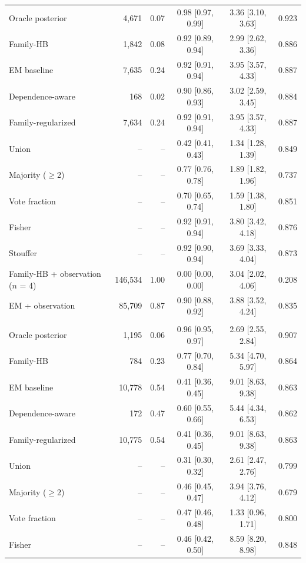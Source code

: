 \begin{table}[htbp]
\begin{tabular}{@{}lrrccc@{}}
Oracle posterior & 4{,}671 & 0.07 & 0.98 [0.97, 0.99] & 3.36 [3.10, 3.63] & 0.923 \\
Family-HB & 1{,}842 & 0.08 & 0.92 [0.89, 0.94] & 2.99 [2.62, 3.36] & 0.886 \\
EM baseline & 7{,}635 & 0.24 & 0.92 [0.91, 0.94] & 3.95 [3.57, 4.33] & 0.887 \\
Dependence-aware & 168 & 0.02 & 0.90 [0.86, 0.93] & 3.02 [2.59, 3.45] & 0.884 \\
Family-regularized & 7{,}634 & 0.24 & 0.92 [0.91, 0.94] & 3.95 [3.57, 4.33] & 0.887 \\
Union & -- & -- & 0.42 [0.41, 0.43] & 1.34 [1.28, 1.39] & 0.849 \\
Majority ($\geq$2) & -- & -- & 0.77 [0.76, 0.78] & 1.89 [1.82, 1.96] & 0.737 \\
Vote fraction & -- & -- & 0.70 [0.65, 0.74] & 1.59 [1.38, 1.80] & 0.851 \\
Fisher & -- & -- & 0.92 [0.91, 0.94] & 3.80 [3.42, 4.18] & 0.876 \\
Stouffer & -- & -- & 0.92 [0.90, 0.94] & 3.69 [3.33, 4.04] & 0.873 \\
Family-HB + observation ($n$ = 4) & 146{,}534 & 1.00 & 0.00 [0.00, 0.00] & 3.04 [2.02, 4.06] & 0.208 \\
EM + observation & 85{,}709 & 0.87 & 0.90 [0.88, 0.92] & 3.88 [3.52, 4.24] & 0.835 \\
\addlinespace[3pt]
\multicolumn{6}{@{}l}{\emph{Hub-concentrated literature copying}} \\
Oracle posterior & 1{,}195 & 0.06 & 0.96 [0.95, 0.97] & 2.69 [2.55, 2.84] & 0.907 \\
Family-HB & 784 & 0.23 & 0.77 [0.70, 0.84] & 5.34 [4.70, 5.97] & 0.864 \\
EM baseline & 10{,}778 & 0.54 & 0.41 [0.36, 0.45] & 9.01 [8.63, 9.38] & 0.863 \\
Dependence-aware & 172 & 0.47 & 0.60 [0.55, 0.66] & 5.44 [4.34, 6.53] & 0.862 \\
Family-regularized & 10{,}775 & 0.54 & 0.41 [0.36, 0.45] & 9.01 [8.63, 9.38] & 0.863 \\
Union & -- & -- & 0.31 [0.30, 0.32] & 2.61 [2.47, 2.76] & 0.799 \\
Majority ($\geq$2) & -- & -- & 0.46 [0.45, 0.47] & 3.94 [3.76, 4.12] & 0.679 \\
Vote fraction & -- & -- & 0.47 [0.46, 0.48] & 1.33 [0.96, 1.71] & 0.800 \\
Fisher & -- & -- & 0.46 [0.42, 0.50] & 8.59 [8.20, 8.98] & 0.848 \\

\end{tabular}
\end{table}
